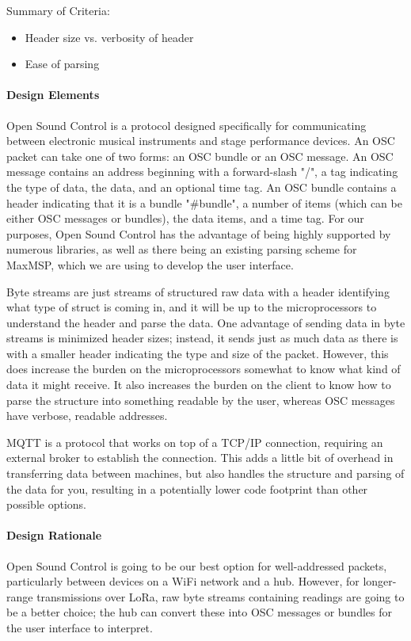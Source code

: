 \documentclass[onecolumn, draftclsnofoot,10pt, compsoc]{IEEEtran}
\begin{document}
    Summary of Criteria:
    \begin{itemize}[noitemsep,topsep=-10pt]
        \item Header size vs. verbosity of header
        \item Ease of parsing
    \end{itemize}

\paragraph{Design Elements}
    Open Sound Control is a protocol designed specifically for communicating between electronic musical instruments and stage performance devices. An OSC packet can take one of two forms: an OSC bundle or an OSC message. An OSC message contains an address beginning with a forward-slash "/", a tag indicating the type of data, the data, and an optional time tag. An OSC bundle contains a header indicating that it is a bundle "\#bundle", a number of items (which can be either OSC messages or bundles), the data items, and a time tag. For our purposes, Open Sound Control has the advantage of being highly supported by numerous libraries, as well as there being an existing parsing scheme for MaxMSP, which we are using to develop the user interface. \cite{OSC} 

    Byte streams are just streams of structured raw data with a header identifying what type of struct is coming in, and it will be up to the microprocessors to understand the header and parse the data. One advantage of sending data in byte streams is minimized header sizes; instead, it sends just as much data as there is with a smaller header indicating the type and size of the packet. However, this does increase the burden on the microprocessors somewhat to know what kind of data it might receive. It also increases the burden on the client to know how to parse the structure into something readable by the user, whereas OSC messages have verbose, readable addresses.

    MQTT is a protocol that works on top of a TCP/IP connection, requiring an external broker to establish the connection. This adds a little bit of overhead in transferring data between machines, but also handles the structure and parsing of the data for you, resulting in a potentially lower code footprint than other possible options. \cite{MQTT}

\paragraph{Design Rationale}
    Open Sound Control is going to be our best option for well-addressed packets, particularly between devices on a WiFi network and a hub. However, for longer-range transmissions over LoRa, raw byte streams containing readings are going to be a better choice; the hub can convert these into OSC messages or bundles for the user interface to interpret. 
\end{document}
